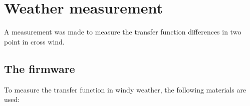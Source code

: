 \chapter{Weather measurement}
A measurement was made to measure the transfer function differences in two point in cross wind.


\section*{The firmware}
To measure the transfer function in windy weather, the following materials are used:



